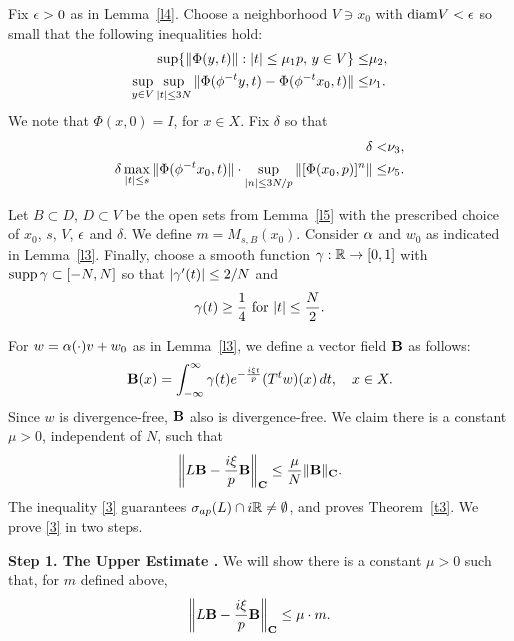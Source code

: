 Fix $\epsilon > 0$ as in Lemma~\ref{l4}. Choose a neighborhood $V\ni x_0$
with ${\operatorname{diam}} {V}<\epsilon$ so small that the following inequalities hold:
\begin{align}
\sup \{ \| \Phi (y,t)\| : |t| \leq \mu_1 p,\,y\in V\} \leq&\mu_2,
\lb{D21}\\
\sup_{y\in V} \sup_{|t| \leq 3N} \| \Phi (\phi^{-t} y, t) - \Phi
(\phi^{-t} x_0, t) \| \leq&\nu_1.
\lb{D1}
\end{align}
We note that $\Phi(x,0)=I$, for $x\in X$.
Fix $\delta$ so that
\begin{align}
\delta< & \nu_3,
\lb{D5}\\
\delta \max_{|t| \leq s} \| \Phi (\phi^{-t} x_0, t) \| \cdot
\sup_{|n| \leq 3N/p} \| [ \Phi (x_0, p)]^n \|\leq
&\nu_5.
\lb{D4}
\end{align}







Let $B\subset D$, $D\subset V$ be the open sets from Lemma~\ref{l5}
with the prescribed choice of $x_0$, $s$, $V$, $\epsilon$ and $\delta$.
We define $m=M_{s,B}(x_0)$. Consider $\alpha$ and
$w_0$ as indicated in Lemma~\ref{l3}.
Finally, choose a smooth function $\gamma : {\Bbb{R}}\to [0,1]$ with $\operatorname{supp} \gamma
\subset [-N, N]$ so that $|\gamma' (t) |  \leq 2/{N}$ and
\begin{equation}
\gam (t) \geq \dfrac14 \mbox{ for } |t| \leq \dfrac{N}2.
\lb{G3}
\end{equation}

For $w=\alpha (\cdot) v + w_0$ as in Lemma~\ref{l3}, we define a
vector field ${\bold B}$ as follows:
\begin{equation}\lb{defbB}
\bB(x) = \int_{-\infty}^\infty \gam(t) e^{-\frac{i\xi t}{p}} (T^t w)(x) \,
dt,\quad x\in X.
\end{equation}
Since $w$ is divergence-free, ${\bold B}$ also is divergence-free.
We claim there is  a constant $\mu>0$, independent of $N$, such that
\begin{equation}
\left\| L\bB -  \dfrac{i\xi}{p} \bB \right\|_{\bC} 
\leq \dfrac{\mu}{N} \|\bB\|_{\bC}.
\lb{3}
\end{equation}
The inequality \eqref{3} guarantees $\sigma_{ap}(L) \cap i{\Bbb{R}} \neq
\emptyset$, and proves Theorem~\ref{t3}.  We prove \eqref{3} in two
steps.

{\bf Step 1. The Upper Estimate .}
We will show there is a constant $\mu>0$ such that, for $m$ defined
above,
\begin{equation}
\left\|L\bB - \dfrac{i\xi}{p} \bB \right\|_{\bC} 
\leq \mu\cdot m.
\lb{5}
\end{equation}

